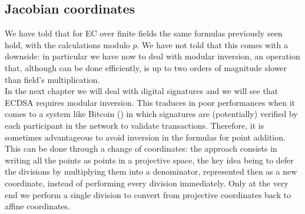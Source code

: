 \bigskip

\subsection{Jacobian coordinates}
\label{jac}
We have told that for EC over finite fields the same formulas previously seen hold, with the calculations modulo $p$. We have not told that this comes with a downside: in particular we have now to deal with modular inversion, an operation that, although can be done efficiently, is up to two orders of magnitude slower than field's multiplication.
\\
In the next chapter we will deal with digital signatures and we will see that ECDSA requires modular inversion. This traduces in poor performances when it comes to a system like Bitcoin (\cite{BTC}) in which signatures are (potentially) verified by each participant in the network to validate transactions. Therefore, it is sometimes advantageous to avoid inversion in the formulas for point addition. This can be done through a change of coordinates: the approach consists in writing all the points as points in a projective space, the key idea being to defer the divisions by multiplying them into a denominator, represented then as a new coordinate, instead of performing every division immediately. Only at the very end we perform a single division to convert from projective coordinates back to affine coordinates. 

